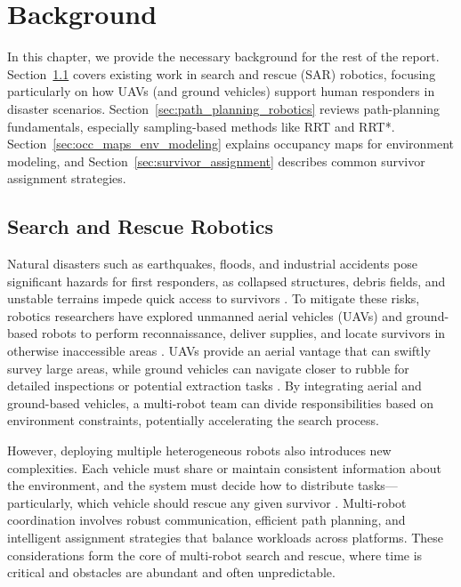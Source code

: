 \documentclass[12pt,a4paper]{report}
\begin{document}
\chapter{Background}
\label{cha:background}
In this chapter, we provide the necessary background for the rest of the report. 
Section~\ref{sec:search_rescue_robotics} covers existing work in search and 
rescue (SAR) robotics, focusing particularly on how UAVs (and ground vehicles) 
support human responders in disaster scenarios. Section~\ref{sec:path_planning_robotics} 
reviews path-planning fundamentals, especially sampling-based methods like RRT and RRT*. 
Section~\ref{sec:occ_maps_env_modeling} explains occupancy maps for environment 
modeling, and Section~\ref{sec:survivor_assignment} describes common survivor 
assignment strategies.

\section{Search and Rescue Robotics}
\label{sec:search_rescue_robotics}
Natural disasters such as earthquakes, floods, and industrial accidents pose significant hazards
for first responders, as collapsed structures, debris fields, and unstable terrains impede quick
access to survivors \cite{Auclair2021CollapseRisk}. To mitigate these risks, robotics researchers have explored
unmanned aerial vehicles (UAVs) and ground-based robots to perform reconnaissance, deliver supplies,
and locate survivors in otherwise inaccessible areas \cite{Daud2022DroneDisaster,Erdelj2017MultiUAV}. UAVs provide an aerial vantage
that can swiftly survey large areas, while ground vehicles can navigate closer to rubble for detailed
inspections or potential extraction tasks \cite{Daud2022DroneDisaster}. By integrating aerial and ground-based
vehicles, a multi-robot team can divide responsibilities based on environment constraints,
potentially accelerating the search process.

However, deploying multiple heterogeneous robots also introduces new complexities. Each vehicle must
share or maintain consistent information about the environment, and the system must decide how to
distribute tasks—particularly, which vehicle should rescue any given survivor \cite{Gerkey2004Taxonomy}. 
Multi-robot coordination involves robust communication, efficient path planning, and
intelligent assignment strategies that balance workloads across platforms. These considerations
form the core of multi-robot search and rescue, where time is critical and obstacles are abundant
and often unpredictable.
\end{document}
